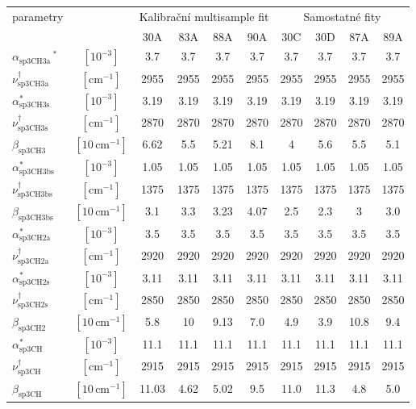 \begin{tabular}{lccccccccc}
\hline
parametry & & \multicolumn{4}{c}{Kalibrační multisample fit} & \multicolumn{4}{c}{Samostatné fity}\\
 &  & 30A & 83A & 88A & 90A & 30C & 30D & 87A & 89A\\
\hline
$\alpha_\mathrm{sp3CH3a}\,^\ast$ & $[10^{-3}]$ & 3.7 & 3.7 & 3.7 & 3.7 & 3.7 & 3.7 & 3.7 & 3.7\\
$\nu_\mathrm{sp3CH3a}^\dagger$ & $[\mathrm{cm}^{-1}]$ & 2955 & 2955 & 2955 & 2955 & 2955 & 2955 & 2955 & 2955\\
$\alpha_\mathrm{sp3CH3s} ^\ast$ & $[10^{-3}]$ & 3.19 & 3.19 & 3.19 & 3.19 & 3.19 & 3.19 & 3.19 & 3.19\\
$\nu_\mathrm{sp3CH3s} ^\dagger$ & $[\mathrm{cm}^{-1}]$ & 2870 & 2870 & 2870 & 2870 & 2870 & 2870 & 2870 & 2870\\
$\beta_\mathrm{sp3CH3}$ & $[10\,\mathrm{cm}^{-1}]$ & 6.62 & 5.5 & 5.21 & 8.1 & 4 & 5.6 & 5.5 & 5.1\\
$\alpha_\mathrm{sp3CH3bs} ^\ast$ & $[10^{-3}]$ & 1.05 & 1.05 & 1.05 & 1.05 & 1.05 & 1.05 & 1.05 & 1.05\\
$\nu_\mathrm{sp3CH3bs} ^\dagger$ & $[\mathrm{cm}^{-1}]$ & 1375 & 1375 & 1375 & 1375 & 1375 & 1375 & 1375 & 1375\\
$\beta_\mathrm{sp3CH3bs}$ & $[10\,\mathrm{cm}^{-1}]$ & 3.1 & 3.3 & 3.23 & 4.07 & 2.5 & 2.3 & 3 & 3.0\\
$\alpha_\mathrm{sp3CH2a} ^\ast$ & $[10^{-3}]$ & 3.5 & 3.5 & 3.5 & 3.5 & 3.5 & 3.5 & 3.5 & 3.5\\
$\nu_\mathrm{sp3CH2a} ^\dagger$ & $[\mathrm{cm}^{-1}]$ & 2920 & 2920 & 2920 & 2920 & 2920 & 2920 & 2920 & 2920\\
$\alpha_\mathrm{sp3CH2s} ^\ast$ & $[10^{-3}]$ & 3.11 & 3.11 & 3.11 & 3.11 & 3.11 & 3.11 & 3.11 & 3.11\\
$\nu_\mathrm{sp3CH2s} ^\dagger$ & $[\mathrm{cm}^{-1}]$ & 2850 & 2850 & 2850 & 2850 & 2850 & 2850 & 2850 & 2850\\
$\beta_\mathrm{sp3CH2}$ & $[10\,\mathrm{cm}^{-1}]$ & 5.8 & 10 & 9.13 & 7.0 & 4.9 & 3.9 & 10.8 & 9.4\\
$\alpha_\mathrm{sp3CH} ^\ast$ & $[10^{-3}]$ & 11.1 & 11.1 & 11.1 & 11.1 & 11.1 & 11.1 & 11.1 & 11.1\\
$\nu_\mathrm{sp3CH} ^\dagger$ & $[\mathrm{cm}^{-1}]$ & 2915 & 2915 & 2915 & 2915 & 2915 & 2915 & 2915 & 2915\\
$\beta_\mathrm{sp3CH}$ & $[10\,\mathrm{cm}^{-1}]$ & 11.03 & 4.62 & 5.02 & 9.5 & 11.0 & 11.3 & 4.8 & 5.0\\

\end{tabular}
